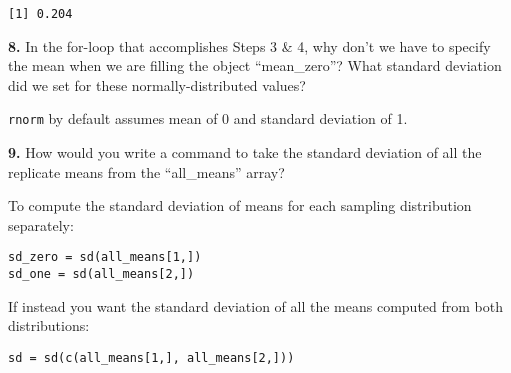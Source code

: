 \documentclass{essay}
\begin{document}
\begin{essaystyle}
\begin{verbatim}
[1] 0.204
\end{verbatim}


\textbf{8.} In the for-loop that accomplishes Steps 3 \& 4, why don't we have to specify
the mean when we are filling the object ``mean\_zero''? What standard deviation
did we set for these normally-distributed values?

\texttt{rnorm} by default assumes mean of 0 and standard deviation of 1.


\textbf{9.} How would you write a command to take the standard deviation of all the
replicate means from the ``all\_means'' array?

To compute the standard deviation of means for each sampling distribution separately:
\begin{verbatim}
sd_zero = sd(all_means[1,])
sd_one = sd(all_means[2,])
\end{verbatim}

If instead you want the standard deviation of all the means computed from both
distributions:
\begin{verbatim}
sd = sd(c(all_means[1,], all_means[2,]))
\end{verbatim}

\end{essaystyle}
\end{document}
